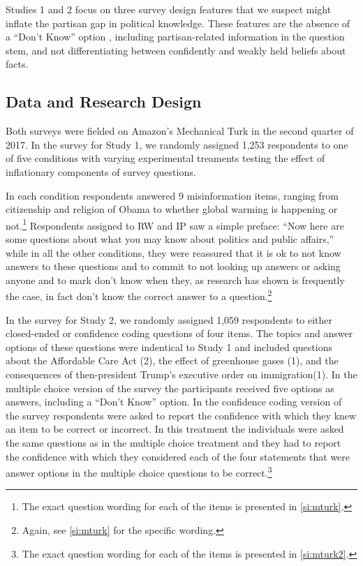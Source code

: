 \documentclass[12pt, letterpaper]{article}
\begin{document}
Studies 1 and 2 focus on three survey design features that we suspect might inflate the partisan gap in political knowledge. These features are the absence of a ``Don't Know'' option%
, including partisan-related information in the question stem, and not differentiating between confidently and weakly held beliefs about facts.

\subsection*{Data and Research Design}\label{sec:data}

Both surveys were fielded on Amazon's Mechanical Turk \citep{BerinskyHuberLenz2012} in the second quarter of 2017. In the survey for Study 1, we randomly assigned 1,253 respondents to one of five conditions with varying experimental treaments testing the effect of inflationary components of survey questions.

In each condition respondents answered 9 misinformation items, ranging from citizenship and religion of Obama to whether global warming is happening or not.\footnote{The exact question wording for each of the items is presented in \cref{si:mturk}.} Respondents assigned to RW and IP saw a simple preface: ``Now here are some questions about what you may know about politics and public affairs,'' while in all the other conditions, they were reassured that it is ok to not know answers to these questions and to commit to not looking up answers or asking anyone and to mark don't know when they, as research has shown is frequently the case, in fact don’t know the correct answer to a question.\footnote{Again, see \cref{si:mturk} for the specific wording.}

In the survey for Study 2, we randomly assigned 1,059 respondents to either closed-ended or confidence coding questions of four items. The topics and answer options of these questions were indentical to Study 1 and included questions about the Affordable Care Act (2), the effect of greenhouse gases (1), and the consequences of then-president Trump's executive order on immigration(1). In the multiple choice version of the survey the participants received five options as answers, including a ``Don't Know'' option. In the confidence coding version of the survey respondents were asked to report the confidence with which they knew an item to be correct or incorrect. In this treatment the individuals were asked the same questions as in the multiple choice treatment and they had to report the confidence with which they considered each of the four statements that were answer options in the multiple choice questions to be correct.\footnote{The exact question wording for each of the items is presented in \cref{si:mturk2}.}
\end{document}
